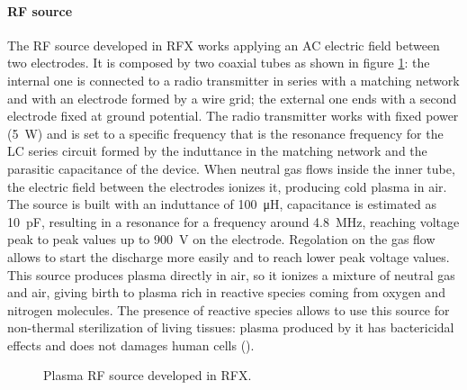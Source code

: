 \paragraph{RF source}
The RF source developed in RFX works applying an AC electric field between two electrodes. It is composed by two coaxial tubes as shown in figure \ref{fig:RF}: the internal one is connected to a radio transmitter in series with a matching network and with an electrode formed by a wire grid; the external one ends with a second electrode fixed at ground potential. The radio transmitter works with fixed power (\SI{5}{\watt}) and is set to a specific frequency that is the resonance frequency for the LC series circuit formed by the induttance in the matching network and the parasitic capacitance of the device. When neutral gas flows inside the inner tube, the electric field between the electrodes ionizes it, producing cold plasma in air. The source is built with an induttance of \SI{100}{\micro\henry}, capacitance is estimated as \SI{10}{\pico\farad}, resulting in a resonance for a frequency around \SI{4.8}{\mega\hertz}, reaching voltage peak to peak values up to \SI{900}{\volt} on the electrode. Regolation on the gas flow allows to start the discharge more easily and to reach lower peak voltage values.
This source produces plasma directly in air, so it ionizes a mixture of neutral gas and air, giving birth to plasma rich in reactive species coming from oxygen and nitrogen molecules. The presence of reactive species allows to use this source for non-thermal sterilization of living tissues: plasma produced by it has bactericidal effects and does not damages human cells (\cite{doi:10.1002/ppap.200700154}).
\begin{figure}
 \centering
 \hfill
 \caption{Plasma RF source developed in RFX.}
 \label{fig:RF}
\end{figure}


